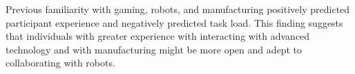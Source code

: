        Previous familiarity with gaming, robots, and manufacturing positively predicted  participant experience and negatively predicted  task load. This finding suggests that individuals with greater experience with interacting with advanced technology and with manufacturing might be more open and adept to collaborating with robots. 